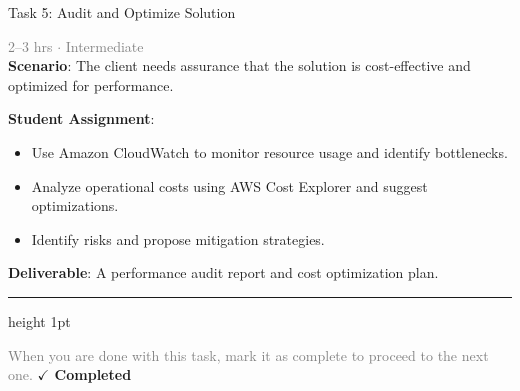 \documentclass[10pt,a4paper]{article}
\begin{document}
\begin{taskbox}{Task 5: Audit and Optimize Solution}

    {\small \textcolor{gray}{2--3 hrs $\cdot$ Intermediate}}\\[12pt]

    \textbf{Scenario}: The client needs assurance that the solution is cost-effective and optimized for performance.  

\textbf{Student Assignment}:  
\begin{itemize}
    \item Use Amazon CloudWatch to monitor resource usage and identify bottlenecks.  
    \item Analyze operational costs using AWS Cost Explorer and suggest optimizations.  
    \item Identify risks and propose mitigation strategies.  
\end{itemize}

\textbf{Deliverable}: A performance audit report and cost optimization plan.\par

    \vspace{16pt}

    \textcolor{cardBorder}{\hrule height 1pt}\vspace{8pt}

    \small \textcolor{gray}{When you are done with this task, mark it as complete to proceed to the next one.} \hfill \textbf{\textcolor{brandDark}{$\checkmark$ Completed}}

\end{taskbox}
\end{document}
